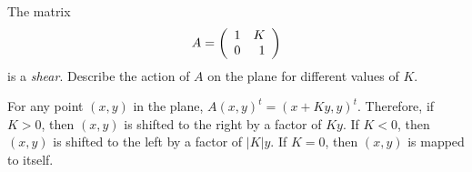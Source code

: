 \documentclass{ximera}
\begin{document}
\begin{exercise} \label{c7.8.1}
The matrix
\[
A=\left(\begin{array}{rr} 1 & K\\ 0 &1\end{array}\right)
\]
is a {\em shear}.  Describe the action of $A$ on the plane
for different values of $K$.

\begin{solution}

For any point $(x,y)$ in the plane, $A(x,y)^t = (x + Ky,y)^t$.  Therefore,
if $K > 0$, then $(x,y)$ is shifted to the right by a factor of $Ky$.  If
$K < 0$, then $(x,y)$ is shifted to the left by a factor of $|K|y$.  If
$K = 0$, then $(x,y)$ is mapped to itself.

\end{solution}
\end{exercise}
\end{document}
